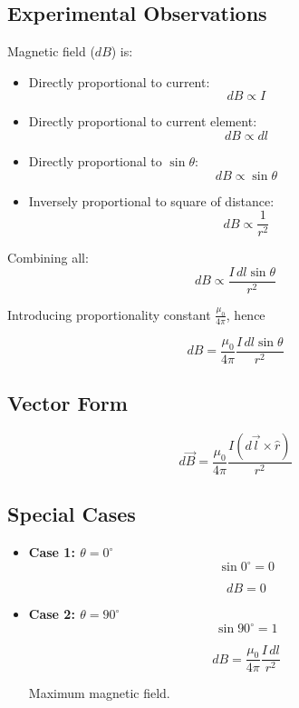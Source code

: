 \documentclass[11pt,a4paper]{article}
\begin{document}
\subsection*{Experimental Observations}
Magnetic field (\( dB \)) is:
\begin{itemize}
    \item Directly proportional to current:
    \[ dB \propto I \]
    \item Directly proportional to current element:
    \[ dB \propto dl \]
    \item Directly proportional to \( \sin\theta \):
    \[ dB \propto \sin\theta \]
    \item Inversely proportional to square of distance:
    \[ dB \propto \frac{1}{r^2} \]
\end{itemize}

Combining all:
\[ dB \propto \frac{I \, dl \sin\theta}{r^2} \]

Introducing proportionality constant \( \frac{\mu_0}{4\pi} \), hence
\begin{tcolorbox}[colback=RoyalBlue!5!white, colframe=RoyalBlue]
    \[ dB = \frac{\mu_0}{4\pi} \frac{I \, dl \sin\theta}{r^2} \]
\end{tcolorbox}

\subsection*{Vector Form}
\begin{tcolorbox}[colback=RoyalBlue!5!white, colframe=RoyalBlue]
    \[ d\vec{B} = \frac{\mu_0}{4\pi} \frac{I(d\vec{l} \times \hat{r})}{r^2} \]
\end{tcolorbox}

\subsection*{Special Cases}
\begin{itemize}
    \item \textbf{Case 1: \( \theta = 0^\circ \)}
    \[ \sin0^\circ = 0 \]
    \begin{tcolorbox}[colback=RoyalBlue!5!white, colframe=RoyalBlue]
        \[ dB = 0 \]
    \end{tcolorbox}
    \item \textbf{Case 2: \( \theta = 90^\circ \)}
    \[ \sin90^\circ = 1 \]
    \begin{tcolorbox}[colback=RoyalBlue!5!white, colframe=RoyalBlue]
        \[ dB = \frac{\mu_0}{4\pi} \frac{I \, dl}{r^2} \]
    \end{tcolorbox}
    Maximum magnetic field.
\end{itemize}
\end{document}
